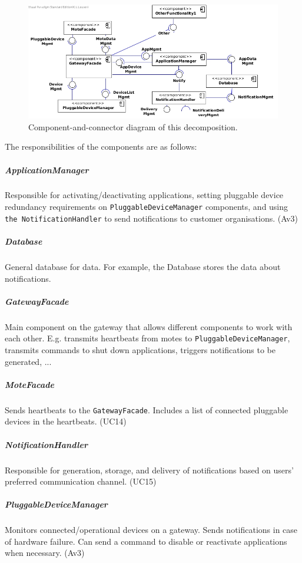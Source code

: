         \begin{figure}[!htp]
        	\centering
        	\includegraphics[width=1.00\textwidth]{component-diagram-1}
        	\caption{Component-and-connector diagram of this decomposition.}
            \label{fig:it1-cc_main}
        \end{figure}

        \noindent The responsibilities of the components are as follows:

    \subparagraph{ApplicationManager}
        Responsible for activating/deactivating applications, setting
        pluggable device redundancy requirements on \texttt{PluggableDeviceManager}
        components, and using \texttt{the NotificationHandler} to send notifications
        to customer organisations. (Av3)

    \subparagraph{Database}
        General database for data. For example, the Database stores the data
        about notifications.

    \subparagraph{GatewayFacade}
        Main component on the gateway that allows different components to work
        with each other. E.g. transmits heartbeats from motes to
        \texttt{PluggableDeviceManager}, transmits commands to shut down applications,
        triggers notifications to be generated, ...

    \subparagraph{MoteFacade}
        Sends heartbeats to the \texttt{GatewayFacade}. Includes a list
        of connected pluggable devices in the heartbeats. (UC14)

    \subparagraph{NotificationHandler}
        Responsible for generation, storage, and delivery of notifications
        based on users' preferred communication channel. (UC15)

    \subparagraph{PluggableDeviceManager}
        Monitors connected/operational devices on a gateway. Sends notifications
        in case of hardware failure. Can send a command to disable or reactivate
        applications when necessary. (Av3)

